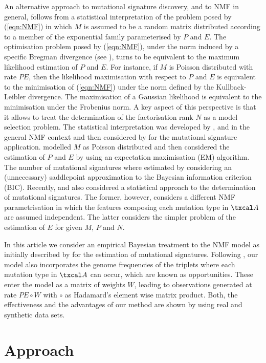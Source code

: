\documentclass{bioinfo}
\begin{document}
An alternative approach to mutational signature discovery, and to NMF
in general, follows from a statistical interpretation of the problem
posed by (\ref{eqn:NMF}) in which $M$ is assumed to be a random matrix
distributed according to a member of the exponential family
parameterised by $P$ and $E$. The optimisation problem posed by
(\ref{eqn:NMF}), under the norm induced by a specific Bregman
divergence (see \citealp{BMD}), turns to be equivalent to the maximum
likelihood estimation of $P$ and $E$.  For instance, if $M$ is Poisson
distributed with rate $PE$, then the likelihood maximisation with
respect to $P$ and $E$ is equivalent to the minimisation of
(\ref{eqn:NMF}) under the norm defined by the Kullback-Leibler
divergence. The maximisation of a Gaussian likelihood is equivalent to
the minimisation under the Frobenius norm. A key aspect of this
perspective is that it allows to treat the determination of the
factorisation rank $N$ as a model selection problem. The statistical
interpretation was developed by \cite{C}, \cite{FC} and \cite{SWK} in
the general NMF context and then considered by \cite{FICMV} for the
mutational signature application. \cite{FICMV} modelled $M$ as Poisson
distributed and then considered the estimation of $P$ and $E$ by using
an expectation maximisation (EM) algorithm. The number of mutational
signatures where estimated by considering an (unnecessary) saddlepoint
approximation to the Bayesian information criterion (BIC). Recently,
\cite{STMS} and \cite{RMHTS} also considered a statistical approach to
the determination of mutational signatures. The former, however,
considers a different NMF parametrisation in which the features
composing each mutation type in $\txcal A$ are assumed
independent. The latter considers the simpler problem of the
estimation of $E$ for given $M$, $P$ and $N$.

In this article we consider an empirical Bayesian treatment to the NMF
model as initially described by \cite{A} for the estimation of
mutational signatures. Following \cite{FICMV}, our model also
incorporates the genome frequencies of the triplets where each
mutation type in $\txcal A$ can occur, which are known as
opportunities. These enter the model as a matrix of weights $W$,
leading to observations generated at rate $PE\circ W$ with $\circ$ as
Hadamard's element wise matrix product. Both, the effectiveness and
the advantages of our method are shown by using real and synthetic
data sets.

\section{Approach}
\end{document}

